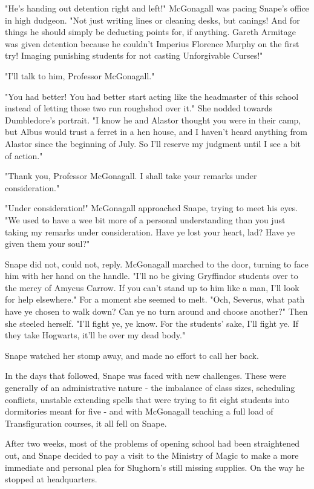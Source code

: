 \documentclass[a4paper,11pt]{article}
\begin{document}
"He's handing out detention right and left!" McGonagall was pacing Snape's office in high dudgeon. "Not just writing lines or cleaning desks, but canings! And for things he should simply be deducting points for, if anything. Gareth Armitage was given detention because he couldn't Imperius Florence Murphy on the first try! Imaging punishing students for not casting Unforgivable Curses!"

"I'll talk to him, Professor McGonagall."

"You had better! You had better start acting like the headmaster of this school instead of letting those two run roughshod over it." She nodded towards Dumbledore's portrait. "I know he and Alastor thought you were in their camp, but Albus would trust a ferret in a hen house, and I haven't heard anything from Alastor since the beginning of July. So I'll reserve my judgment until I see a bit of action."

"Thank you, Professor McGonagall. I shall take your remarks under consideration."

"Under consideration!" McGonagall approached Snape, trying to meet his eyes. "We used to have a wee bit more of a personal understanding than you just taking my remarks under consideration. Have ye lost your heart, lad? Have ye given them your soul?"

Snape did not, could not, reply. McGonagall marched to the door, turning to face him with her hand on the handle. "I'll no be giving Gryffindor students over to the mercy of Amycus Carrow. If you can't stand up to him like a man, I'll look for help elsewhere." For a moment she seemed to melt. "Och, Severus, what path have ye chosen to walk down? Can ye no turn around and choose another?" Then she steeled herself. "I'll fight ye, ye know. For the students' sake, I'll fight ye. If they take Hogwarts, it'll be over my dead body."

Snape watched her stomp away, and made no effort to call her back.

In the days that followed, Snape was faced with new challenges. These were generally of an administrative nature - the imbalance of class sizes, scheduling conflicts, unstable extending spells that were trying to fit eight students into dormitories meant for five - and with McGonagall teaching a full load of Transfiguration courses, it all fell on Snape.

After two weeks, most of the problems of opening school had been straightened out, and Snape decided to pay a visit to the Ministry of Magic to make a more immediate and personal plea for Slughorn's still missing supplies. On the way he stopped at headquarters.
\end{document}
